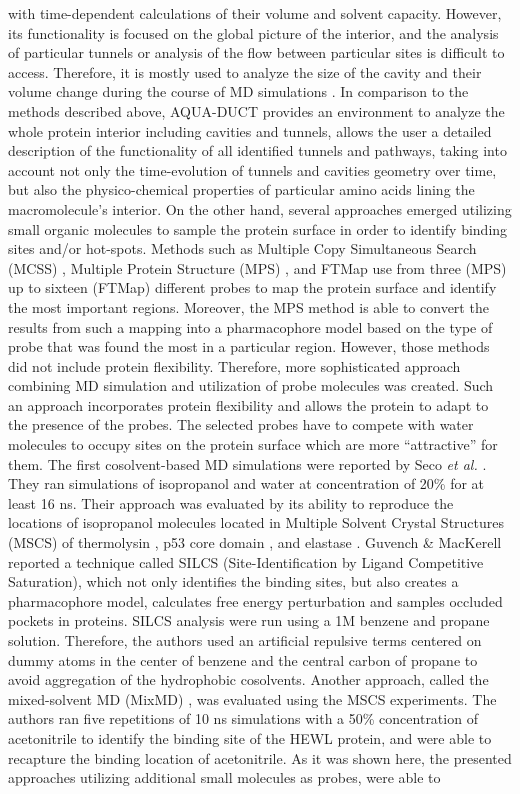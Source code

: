 \documentclass[9pt,tutorial]{livecoms}
\begin{document}
with time-dependent calculations of their volume and solvent capacity. However, its functionality is focused on the global picture of the interior, and the analysis of particular tunnels or analysis of the flow between particular sites is difficult to access. Therefore, it is mostly used to analyze the size of the cavity and their volume change during the course of MD simulations \cite{Mitusinska2020}.
In comparison to the methods described above, AQUA-DUCT provides an environment to analyze the whole protein interior including cavities and tunnels, allows the user a detailed description of the functionality of all identified tunnels and pathways, taking into account not only the time-evolution of tunnels and cavities geometry over time, but also the physico-chemical properties of particular amino acids lining the macromolecule's interior.
On the other hand, several approaches emerged utilizing small organic molecules to sample the protein surface in order to identify binding sites and/or hot-spots. Methods such as Multiple Copy Simultaneous Search (MCSS) \cite{Miranker1991}, Multiple Protein Structure (MPS) \cite{Carlson1999,Lerner2008}, and  FTMap \cite{Brenke2009} use from three (MPS) up to sixteen (FTMap) different probes to map the protein surface and identify the most important regions. Moreover, the MPS method is able to convert the results from such a mapping into a pharmacophore model based on the type of probe that was found the most in a particular region. However, those methods did not include protein flexibility. Therefore, more sophisticated approach combining MD simulation and utilization of probe molecules was created. Such an approach incorporates protein flexibility and allows the protein to adapt to the presence of the probes. The selected probes have to compete with water molecules to occupy sites on the protein surface which are more “attractive” for them. The first cosolvent-based MD simulations were reported by Seco \textit{et al.} \cite{Seco2009}. They ran simulations of isopropanol and water at concentration of 20\% for at least 16 ns. Their approach was evaluated by its ability to reproduce the locations of isopropanol molecules located in Multiple Solvent Crystal Structures (MSCS) of thermolysin \cite{English2001}, p53 core domain \cite{Ho2006}, and elastase \cite{Mattos2006}. Guvench \& MacKerell \cite{Guvench2009} reported a technique called SILCS (Site-Identification by Ligand Competitive Saturation), which not only identifies the binding sites, but also creates a pharmacophore model, calculates free energy perturbation and samples occluded pockets in proteins. SILCS analysis were run using a 1M benzene and propane solution. Therefore, the authors used an artificial repulsive terms centered on dummy atoms in the center of benzene and the central carbon of propane to avoid aggregation of the hydrophobic cosolvents. Another approach, called the mixed-solvent MD (MixMD) \cite{Lexa2011}, was evaluated using the MSCS experiments. The authors ran five repetitions of 10 ns simulations with a 50\% concentration of acetonitrile to identify the binding site of the HEWL protein, and were able to recapture the binding location of acetonitrile. As it was shown here, the presented approaches utilizing additional small molecules as probes, were able to 
\end{document}
